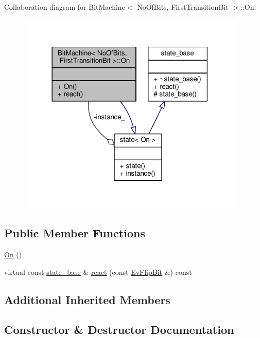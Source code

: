 Collaboration diagram for Bit\+Machine$<$ No\+Of\+Bits, First\+Transition\+Bit $>$\+:\+:On\+:
\nopagebreak
\begin{figure}[H]
\begin{center}
\leavevmode
\includegraphics[width=306pt]{struct_bit_machine_1_1_on__coll__graph}
\end{center}
\end{figure}
\subsection*{Public Member Functions}
\begin{DoxyCompactItemize}
\item 
\mbox{\hyperlink{struct_bit_machine_1_1_on_a795318e3f7466a89f3554ceebac7b569}{On}} ()
\item 
virtual const \mbox{\hyperlink{classstate__base}{state\+\_\+base}} \& \mbox{\hyperlink{struct_bit_machine_1_1_on_a8ec83d08486a1e75c988953e882f8f7f}{react}} (const \mbox{\hyperlink{struct_ev_flip_bit}{Ev\+Flip\+Bit}} \&) const
\end{DoxyCompactItemize}
\subsection*{Additional Inherited Members}


\subsection{Constructor \& Destructor Documentation}
\mbox{\label{struct_bit_machine_1_1_on_a795318e3f7466a89f3554ceebac7b569}} 
